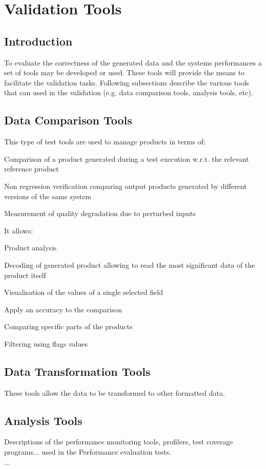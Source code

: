 \section{Validation Tools}
\subsection{Introduction}

To evaluate the correctness of the generated data and the systems performances a set of tools may be developed or used. These
tools will provide the means to facilitate the validation tasks. 
Following subsections describe the various tools that can used in the \product validation (e.g. data comparison tools, analysis tools, etc).

\subsection{Data Comparison Tools}
This type of test tools are used to manage products in terms of:
\begin{itemize_single}
\item Comparison of a product generated during a test execution w.r.t. the relevant reference product
\item Non regression verification comparing output products generated by different versions of the same system
\item Measurement of quality degradation due to perturbed inputs
\end{itemize_single}
It allows:
\begin{itemize_single}
\item Product analysis
\item Decoding of generated product allowing to read the most significant data of the product itself
\item Visualisation of the values of a single selected field
\item Apply an accuracy to the comparison
\item Comparing specific parts of the products
\item Filtering using flags values
\end{itemize_single}

\subsection{Data Transformation Tools}
These tools allow the data to be transformed to other formatted data.

\subsection{Analysis Tools}
Descriptions of the performance monitoring tools, profilers, test coverage programs... used in the Performance evaluation tests.\\
...

